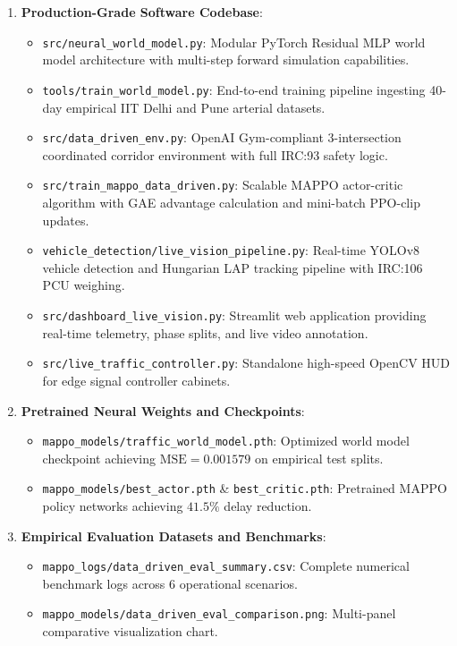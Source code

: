\begin{enumerate}
    \item \textbf{Production-Grade Software Codebase}:
    \begin{itemize}
        \item \texttt{src/neural\_world\_model.py}: Modular PyTorch Residual MLP world model architecture with multi-step forward simulation capabilities.
        \item \texttt{tools/train\_world\_model.py}: End-to-end training pipeline ingesting 40-day empirical IIT Delhi and Pune arterial datasets.
        \item \texttt{src/data\_driven\_env.py}: OpenAI Gym-compliant 3-intersection coordinated corridor environment with full IRC:93 safety logic.
        \item \texttt{src/train\_mappo\_data\_driven.py}: Scalable MAPPO actor-critic algorithm with GAE advantage calculation and mini-batch PPO-clip updates.
        \item \texttt{vehicle\_detection/live\_vision\_pipeline.py}: Real-time YOLOv8 vehicle detection and Hungarian LAP tracking pipeline with IRC:106 PCU weighing.
        \item \texttt{src/dashboard\_live\_vision.py}: Streamlit web application providing real-time telemetry, phase splits, and live video annotation.
        \item \texttt{src/live\_traffic\_controller.py}: Standalone high-speed OpenCV HUD for edge signal controller cabinets.
    \end{itemize}

    \item \textbf{Pretrained Neural Weights and Checkpoints}:
    \begin{itemize}
        \item \texttt{mappo\_models/traffic\_world\_model.pth}: Optimized world model checkpoint achieving $\text{MSE} = 0.001579$ on empirical test splits.
        \item \texttt{mappo\_models/best\_actor.pth} \& \texttt{best\_critic.pth}: Pretrained MAPPO policy networks achieving $41.5\%$ delay reduction.
    \end{itemize}

    \item \textbf{Empirical Evaluation Datasets and Benchmarks}:
    \begin{itemize}
        \item \texttt{mappo\_logs/data\_driven\_eval\_summary.csv}: Complete numerical benchmark logs across 6 operational scenarios.
        \item \texttt{mappo\_models/data\_driven\_eval\_comparison.png}: Multi-panel comparative visualization chart.
    \end{itemize}
\end{enumerate}

